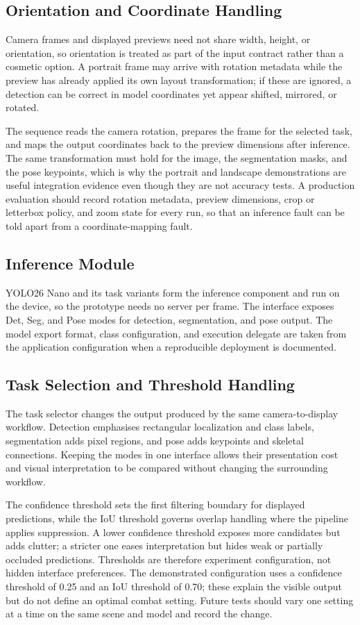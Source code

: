 \subsection{Orientation and Coordinate Handling}
Camera frames and displayed previews need not share width, height, or orientation, so orientation is
treated as part of the input contract rather than a cosmetic option. A portrait frame may arrive with
rotation metadata while the preview has already applied its own layout transformation; if these are
ignored, a detection can be correct in model coordinates yet appear shifted, mirrored, or rotated.

The sequence reads the camera rotation, prepares the frame for the selected task, and maps the output
coordinates back to the preview dimensions after inference. The same transformation must hold for the
image, the segmentation masks, and the pose keypoints, which is why the portrait and landscape
demonstrations are useful integration evidence even though they are not accuracy tests. A production
evaluation should record rotation metadata, preview dimensions, crop or letterbox policy, and zoom
state for every run, so that an inference fault can be told apart from a coordinate-mapping fault.

\subsection{Inference Module}
YOLO26 Nano and its task variants form the inference component and run on the device, so the
prototype needs no server per frame. The interface exposes Det, Seg, and Pose modes for detection,
segmentation, and pose output. The model export format, class configuration, and execution delegate
are taken from the application configuration when a reproducible deployment is documented.

\subsection{Task Selection and Threshold Handling}
The task selector changes the output produced by the same camera-to-display workflow. Detection
emphasises rectangular localization and class labels, segmentation adds pixel regions, and pose adds
keypoints and skeletal connections. Keeping the modes in one interface allows their presentation cost
and visual interpretation to be compared without changing the surrounding workflow.

The confidence threshold sets the first filtering boundary for displayed predictions, while the IoU
threshold governs overlap handling where the pipeline applies suppression. A lower confidence
threshold exposes more candidates but adds clutter; a stricter one eases interpretation but hides
weak or partially occluded predictions. Thresholds are therefore experiment configuration, not hidden
interface preferences. The demonstrated configuration uses a confidence threshold of 0.25 and an IoU
threshold of 0.70; these explain the visible output but do not define an optimal combat setting.
Future tests should vary one setting at a time on the same scene and model and record the change.

